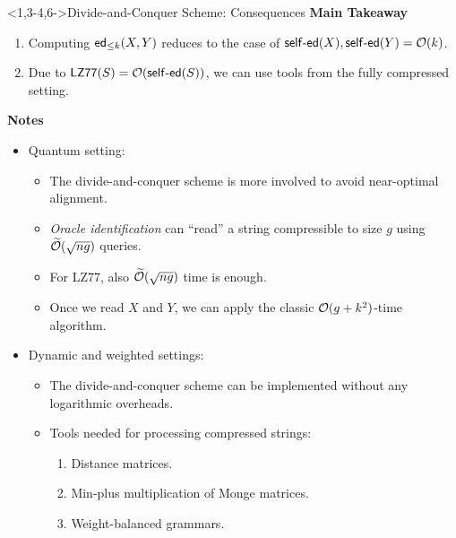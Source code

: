 \documentclass[sans-serif,aspectratio=169]{beamer}
\begin{document}
  \begin{frame}<1,3-4,6->{Divide-and-Conquer Scheme: Consequences}
    \textbf{Main Takeaway}
   \begin{enumerate}
    \item Computing $\mathsf{ed}_{\le k}(X,Y)$ reduces to the case of $\mathsf{self}\text{-}\mathsf{ed}(X), \mathsf{self}\text{-}\mathsf{ed}(Y)=\mathcal{O}(k)$.
    \item<3-> Due to $\mathsf{LZ77}(S)=\mathcal{O}(\mathsf{self}\text{-}\mathsf{ed}(S))$, we can use tools from the fully compressed setting.
\end{enumerate}
\pause\pause\pause\bigskip

\textbf{Notes}
\begin{itemize}
    \item<4-> Quantum setting:
    \begin{itemize}
        \item<4-> The divide-and-conquer scheme is more involved to avoid near-optimal alignment.
        \item<5-> \emph{Oracle identification} can ``read'' a string compressible to size $g$ using $\widetilde{\mathcal{O}}(\sqrt{ng})$ queries.
        \item<5-> For LZ77, also $\widetilde{\mathcal{O}}(\sqrt{ng})$ time is enough.
        \item<6-> Once we read $X$ and $Y$, we can apply the classic $\mathcal{O}(g+k^2)$-time algorithm.
    \end{itemize}
    \item<7->Dynamic and weighted settings:
    \begin{itemize}
        \item<7-> The divide-and-conquer scheme can be implemented without any logarithmic overheads.
        \item<8-> Tools needed for processing compressed strings: 
        \begin{enumerate}
            \item Distance matrices.
            \item Min-plus multiplication of Monge matrices.
            \item Weight-balanced grammars.
        \end{enumerate}
    \end{itemize}
   \end{itemize}
  \end{frame}
\end{document}
